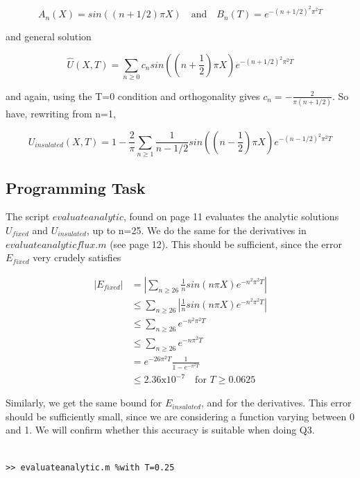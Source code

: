 \documentclass[10pt,a4paper]{report}
\begin{document}
\begin{equation*}
A_n(X)=sin((n+1/2)\pi X) \quad \text{and} \quad B_n(T)=e^{-(n+1/2)^2\pi^2 T}
\end{equation*}

and general solution

\begin{equation*}
\hat{U}(X,T)=\sum_{n\geq 0} c_n sin((n+\frac{1}{2})\pi X) e^{-(n+1/2)^2\pi^2 T}
\end{equation*}

and again, using the T=0 condition and orthogonality gives $c_n=-\frac{2}{\pi(n+1/2)}$. So have, rewriting from n=1,

\begin{equation*}
U_{insulated}(X,T)=1-\frac{2}{\pi}\sum_{n\geq 1} \frac{1}{n-1/2}sin((n-\frac{1}{2})\pi X) e^{-(n-1/2)^2\pi^2 T}
\end{equation*}

\subsection*{Programming Task}

The script $evaluateanalytic$, found on page 11 evaluates the analytic solutions $U_{fixed}$ and $U_{insulated}$, up to n=25. We do the same for the derivatives in $evaluateanalyticflux.m$ (see page 12). This should be sufficient, since the error $E_{fixed}$ very crudely satisfies

\begin{equation*}
\begin{split}
|E_{fixed}| & =  |\sum_{n\geq 26} \frac{1}{n}sin(n\pi X) e^{-n^2\pi^2 T}| \\
 & \leq \sum_{n\geq 26} |\frac{1}{n}sin(n\pi X) e^{-n^2\pi^2 T}|\\
 & \leq \sum_{n\geq 26} e^{-n^2\pi^2 T}\\
 & \leq \sum_{n\geq 26} e^{-n\pi^2 T}\\
 & = e^{-26\pi^2T}\frac{1}{1-e^{-\pi^2T}}\\
 & \leq 2.36\text{x}10^{-7} \quad \text{for } T\geq 0.0625 
\end{split} 
\end{equation*}

Similarly, we get the same bound for $E_{insulated}$, and for the derivatives. This error should be sufficiently small, since we are considering a function varying between 0 and 1. We will confirm whether this accuracy is suitable when doing Q3.

\begin{verbatim}

>> evaluateanalytic.m %with T=0.25

\end{verbatim}
\end{document}
